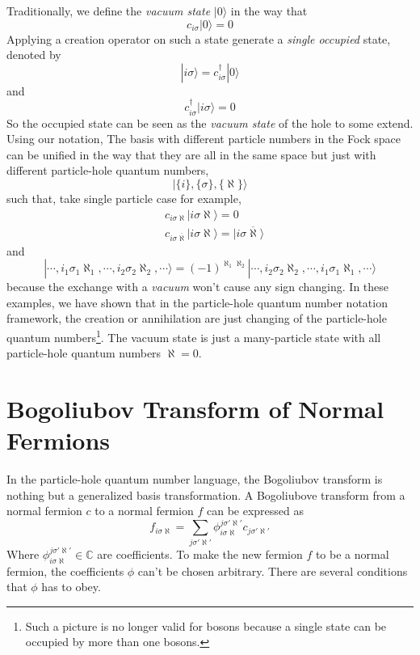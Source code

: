 \documentclass[12font]{article}
\theoremstyle{definition}
\numberwithin{equation}{section}
\newcommand{\ket}[1]{| #1 \rangle}
\newcommand{\llrg}[1]{\{  #1  \}}
\begin{document}
Traditionally, we define the \emph{vacuum state} $\ket{0}$ in the way that
\[
c_{i\sigma}\ket{0} = 0
\]
Applying a creation operator on such a state generate a \emph{single occupied} state, denoted by
\[
\ket{i\sigma} = c^\dagger_{i\sigma}\ket{0}
\]
and 
\[
c^\dagger_{i\sigma}\ket{i\sigma} = 0
\]
So the occupied state can be seen as the \emph{vacuum state} of the hole to some extend. Using our notation, The basis with different particle numbers in the Fock space can be unified in the way that they are all in the same space but just with different particle-hole quantum numbers,
\[
\ket{\llrg{i},\llrg{\sigma},\llrg{\aleph}}
\]
such that, take single particle case for example,
\[
\begin{aligned}
& c_{i\sigma\aleph}\ket{i\sigma\aleph} = 0 \\
& c_{i\sigma\overline{\aleph}}\ket{i\sigma\aleph} = \ket{i\sigma\overline{\aleph}} 
\end{aligned}
\]
and
\[
\ket{\cdots , i_1\sigma_1\aleph_1, \cdots, i_2\sigma_2\aleph_2,\cdots} = (-1)^{\aleph_1\aleph_2}\ket{\cdots, i_2\sigma_2\aleph_2, \cdots, i_1\sigma_1\aleph_1,\cdots}
\]
because the exchange with a \emph{vacuum} won't cause any sign changing. In these examples, we have shown that in the particle-hole quantum number notation framework, the creation or annihilation are just changing of the particle-hole quantum numbers\footnote{Such a picture is no longer valid for bosons because a single state can be occupied by more than one bosons.}. The vacuum state is just a many-particle state with all particle-hole quantum numbers $\aleph=0$.

\section{Bogoliubov Transform of Normal Fermions}
In the particle-hole quantum number language, the Bogoliubov transform is nothing but a generalized basis transformation. A Bogoliubove transform from a normal fermion $c$ to a normal fermion $f$ can be expressed as
\[
f_{i\sigma\aleph} = \sum_{j\sigma'\aleph'}\phi^{j\sigma'\aleph'}_{i\sigma\aleph}c_{j\sigma'\aleph'}
\]
Where $\phi^{j\sigma'\aleph'}_{i\sigma\aleph} \in \mathbb{C}$ are coefficients. To make the new fermion $f$ to be a normal fermion, the coefficients $\phi$ can't be chosen arbitrary. There are several conditions that $\phi$ has to obey. 
\end{document}
